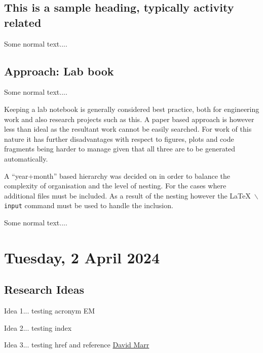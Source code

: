 \subsection{This is a sample heading, typically activity related}

Some normal text....

\subsection{Approach: Lab book}

Some normal text....

\begin{slantnote}
  Keeping a lab notebook is generally considered best practice, both for
  engineering work and also research projects such as this. A paper based
  approach is however less than ideal as the resultant work cannot be
  easily searched. For work of this nature it has further disadvantages
  with respect to figures, plots and code fragments being harder to manage
  given that all three are to be generated automatically.

  A ``year+month'' based hierarchy was decided on in order to balance the
  complexity of organisation and the level of nesting. For the cases where
  additional files must be included. As a result of the nesting however the
  \LaTeX\ \texttt{$\backslash$input} command must be used to handle the
  inclusion.
\end{slantnote}

Some normal text....

\pendsign

\section[2024/04/04]{Tuesday, 2 April 2024}

\subsection{Research Ideas}

\begin{compactitem}
\item Idea 1... testing acronym \ac{EM}
\item Idea 2... testing index 
\item Idea 3... testing href and reference
\href{http://en.wikipedia.org/wiki/David_Marr_(neuroscientist)}{David Marr}
~\cite{marr_aa_2010}
\end{compactitem}

